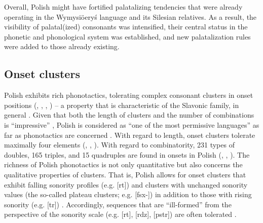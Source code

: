 \documentclass[output=paper,hidelinks]{langscibook}
\begin{document}
Overall, Polish might have fortified palatalizing tendencies that were already operating in the Wymysiöeryś language and its Silesian relatives. As a result, the visibility of palatal(ized) consonants was intensified, their central status in the phonetic and phonological system was established, and new palatalization rules were added to those already existing.

\subsection{Onset clusters}\label{sec:wymsorys:4.7}


Polish exhibits rich phonotactics, tolerating complex consonant clusters in onset positions (\citealt{gussmann_phonology_2007}, \citealt[567]{zydorowicz_consonant_2010}, \citealt{dziubalska-kolaczyk_production_2014}, \citealt[101]{zydorowicz_he_2017}) – a property that is characteristic of the Slavonic family, in general \citep{sussex_slavic_2006}. Given that both the length of clusters and the number of combinations is ``impressive'' \citep[101]{zydorowicz_he_2017}, Polish is considered as ``one of the most permissive languages'' as far as phonotactics are concerned \citep[62]{kijak_polish_2008}. With regard to length, onset clusters tolerate maximally four elements (\citealt[565]{zydorowicz_consonant_2010}, \citealt{dziubalska-kolaczyk_production_2014}, \citealt[98]{zydorowicz_he_2017}). With regard to combinatority, 231 types of doubles, 165 triples, and 15 quadruples are found in onsets in Polish (\citealt{bargielowna_grupy_1950}, \citealt[565--567]{zydorowicz_consonant_2010}, %
\citealt[107--108]{zydorowicz_he_2017}). The richness of Polish phonotactics is not only quantitative but also concerns the qualitative properties of clusters. That is, Polish allows for onset clusters that exhibit falling sonority profiles (e.g. [rt]) and clusters with unchanged sonority values (the so-called plateau clusters; e.g. [fsx\nobreakdash-]) in addition to those with rising sonority (e.g. [tr]) \citep[104]{dukiewicz_rodzaje_1980, zydorowicz_he_2017}. Accordingly, sequences that are ``ill-formed'' from the perspective of the sonority scale (e.g. [rt], [rdz], [pstr]) are often tolerated \citep[104]{zydorowicz_he_2017}.
\end{document}
